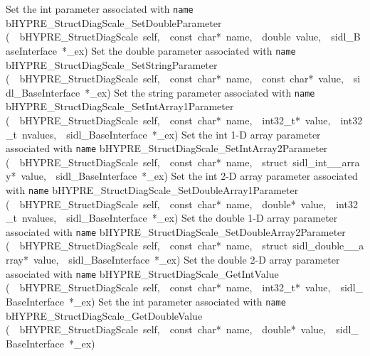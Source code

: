 \documentclass{article}
\begin{document}
\begin{cxxentry}
\begin{cxxentry}
\begin{cxxnames}
        {
Set the int parameter associated with {\tt name}}
        {}
\label{cxx.7.1.17}
        {bHYPRE\_StructDiagScale\_SetDoubleParameter}
        {(\ \ bHYPRE\_StructDiagScale\ self,\ \ const\ char*\ name,\ \ double\ value,\ \ sidl\_BaseInterface\ *\_ex)}
        {
Set the double parameter associated with {\tt name}}
        {}
\label{cxx.7.1.18}
        {bHYPRE\_StructDiagScale\_SetStringParameter}
        {(\ \ bHYPRE\_StructDiagScale\ self,\ \ const\ char*\ name,\ \ const\ char*\ value,\ \ sidl\_BaseInterface\ *\_ex)}
        {
Set the string parameter associated with {\tt name}}
        {}
\label{cxx.7.1.19}
        {bHYPRE\_StructDiagScale\_SetIntArray1Parameter}
        {(\ \ bHYPRE\_StructDiagScale\ self,\ \ const\ char*\ name,\ \ int32\_t*\ value,\ \ int32\_t\ nvalues,\ \ sidl\_BaseInterface\ *\_ex)}
        {
Set the int 1-D array parameter associated with {\tt name}}
        {}
\label{cxx.7.1.20}
        {bHYPRE\_StructDiagScale\_SetIntArray2Parameter}
        {(\ \ bHYPRE\_StructDiagScale\ self,\ \ const\ char*\ name,\ \ struct\ sidl\_int\_\_array*\ value,\ \ sidl\_BaseInterface\ *\_ex)}
        {
Set the int 2-D array parameter associated with {\tt name}}
        {}
\label{cxx.7.1.21}
        {bHYPRE\_StructDiagScale\_SetDoubleArray1Parameter}
        {(\ \ bHYPRE\_StructDiagScale\ self,\ \ const\ char*\ name,\ \ double*\ value,\ \ int32\_t\ nvalues,\ \ sidl\_BaseInterface\ *\_ex)}
        {
Set the double 1-D array parameter associated with {\tt name}}
        {}
\label{cxx.7.1.22}
        {bHYPRE\_StructDiagScale\_SetDoubleArray2Parameter}
        {(\ \ bHYPRE\_StructDiagScale\ self,\ \ const\ char*\ name,\ \ struct\ sidl\_double\_\_array*\ value,\ \ sidl\_BaseInterface\ *\_ex)}
        {
Set the double 2-D array parameter associated with {\tt name}}
        {}
\label{cxx.7.1.23}
        {bHYPRE\_StructDiagScale\_GetIntValue}
        {(\ \ bHYPRE\_StructDiagScale\ self,\ \ const\ char*\ name,\ \ int32\_t*\ value,\ \ sidl\_BaseInterface\ *\_ex)}
        {
Set the int parameter associated with {\tt name}}
        {}
\label{cxx.7.1.24}
        {bHYPRE\_StructDiagScale\_GetDoubleValue}
        {(\ \ bHYPRE\_StructDiagScale\ self,\ \ const\ char*\ name,\ \ double*\ value,\ \ sidl\_BaseInterface\ *\_ex)}

\end{cxxnames}
\end{cxxentry}
\end{cxxentry}
\end{document}
